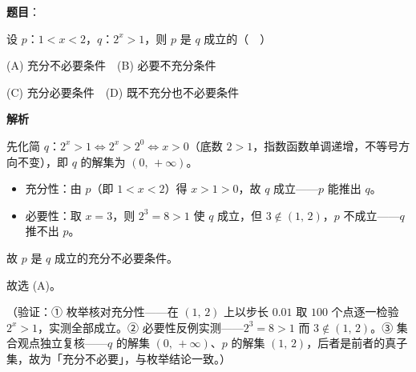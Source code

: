\begin{answer}

\textbf{题目}：

设 \(p\)：\(1<x<2\)，\(q\)：\(2^x>1\)，则 \(p\) 是 \(q\) 成立的（　）

(A) 充分不必要条件　(B) 必要不充分条件

(C) 充分必要条件　(D) 既不充分也不必要条件

\textbf{解析}

先化简 \(q\)：\(2^{x}>1\iff 2^{x}>2^{0}\iff x>0\)（底数 \(2>1\)，指数函数单调递增，不等号方向不变），即 \(q\) 的解集为 \((0,\,+\infty)\)。

\begin{itemize}
\item 充分性：由 \(p\)（即 \(1<x<2\)）得 \(x>1>0\)，故 \(q\) 成立——\(p\) 能推出 \(q\)。
\item 必要性：取 \(x=3\)，则 \(2^{3}=8>1\) 使 \(q\) 成立，但 \(3\notin(1,\,2)\)，\(p\) 不成立——\(q\) 推不出 \(p\)。
\end{itemize}

故 \(p\) 是 \(q\) 成立的充分不必要条件。

故选 (A)。

（验证：① 枚举核对充分性——在 \((1,\,2)\) 上以步长 \(0.01\) 取 \(100\) 个点逐一检验 \(2^{x}>1\)，实测全部成立。② 必要性反例实测——\(2^{3}=8>1\) 而 \(3\notin(1,\,2)\)。③ 集合观点独立复核——\(q\) 的解集 \((0,\,+\infty)\)、\(p\) 的解集 \((1,\,2)\)，后者是前者的真子集，故为「充分不必要」，与枚举结论一致。）


\end{answer}
